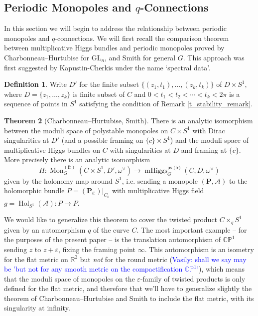 \documentclass[11pt, oneside, reqno]{amsart}
\theoremstyle{definition} \newtheorem{definition}{Definition}[section]
\newtheorem{theorem}[definition]{Theorem}
\theoremstyle{definition} \newtheorem{remark}[definition]{Remark}
\theoremstyle{definition} \newtheorem{remarks}[definition]{Remarks}
\theoremstyle{definition} \newtheorem{question}[definition]{Question}
\theoremstyle{definition} \newtheorem*{note}{Note}
\theoremstyle{definition} \newtheorem{example}[definition]{Example}
\theoremstyle{definition} \newtheorem{examples}[definition]{Examples}
\newcommand{\bb}[1]{\mathbb{#1}}
\newcommand{\mc}[1]{\mathcal{#1}}
\newcommand{\bo}[1]{\boldsymbol{#1}}
\newcommand{\CC}{\mathbb{C}}
\newcommand{\RR}{\mathbb{R}}
\newcommand{\eps}{\varepsilon}
\newcommand{\GL}{\mathrm{GL}}
\DeclareMathOperator{\mhiggs}{mHiggs}
\DeclareMathOperator{\mon}{Mon}
\DeclareMathOperator{\Hol}{Hol}
\newcommand{\fr}{\mathrm{fr}}
\newcommand{\vasily}[1]{(\textcolor{blue}{Vasily: #1})}
\begin{document}
\subsection{Periodic Monopoles and $q$-Connections}
In this section we will begin to address the relationship between periodic monopoles and $q$-connections.  We will first recall the comparison theorem between multiplicative Higgs bundles and periodic monopoles proved by Charbonneau--Hurtubise \cite{CharbonneauHurtubise} for $\GL_n$, and Smith \cite{Smith} for general $G$. This approach was first suggested by Kapustin-Cherkis \cite{CherkisKapustin2} under the name `spectral data'. 

\begin{definition}
Write $D'$ for the finite subset $\{(z_1,t_1), \ldots, (z_k, t_k)\}$ of $D \times S^1$, where $D = \{z_1, \ldots, z_k\}$ is finite subset of $C$ and $0 < t_1 < t_2 < \cdots < t_k < 2\pi$ is a sequence of points in $S^1$ satisfying the condition of Remark \ref{t_stability_remark}.
\end{definition}

\begin{theorem}[Charbonneau--Hurtubise, Smith] \label{CHS_thm}
There is an analytic isomorphism between the moduli space of polystable monopoles on $C \times S^1$ with Dirac singularities at $D'$ (and a possible framing on $\{c\} \times S^1$) and the moduli space of multiplicative Higgs bundles on $C$ with singularities at $D$ and framing at $\{c\}$.  More precisely there is an analytic isomorphism
\[H \colon \mon^{(\fr)}_G(C \times S^1, D', \omega^\vee) \to \mhiggs_G^{\text{ps,(fr)}}(C, D, \omega^\vee)\]
given by the holonomy map around $S^1$, i.e. sending a monopole $(\bo P, \mc A)$ to the holomorphic bundle $P = (\bo P_\CC)|_{C_0}$ with multiplicative Higgs field $g = \Hol_{S^1}(\mc A) \colon P \to P$.
\end{theorem}

We would like to generalize this theorem to cover the twisted product $C \times_q S^1$ given by an automorphism $q$ of the curve $C$.  The most important example -- for the purposes of the present paper -- is the translation automorphism of $\bb{CP}^1$ sending $z$ to $z + \eps$, fixing the framing point $\infty$.  This automorphism is an isometry for the flat metric on $\RR^2$ but \emph{not} for the round metric \vasily{shall we say may be 'but not for any smooth metric
  on the compactification  $\bb{CP}^1$'}, which means that the moduli space of monopoles on the $\eps$-family of twisted products is only defined for the flat metric, and therefore that we'll have to generalize slightly the theorem of Charbonneau--Hurtubise and Smith to include the flat metric, with its singularity at infinity.
\end{document}
